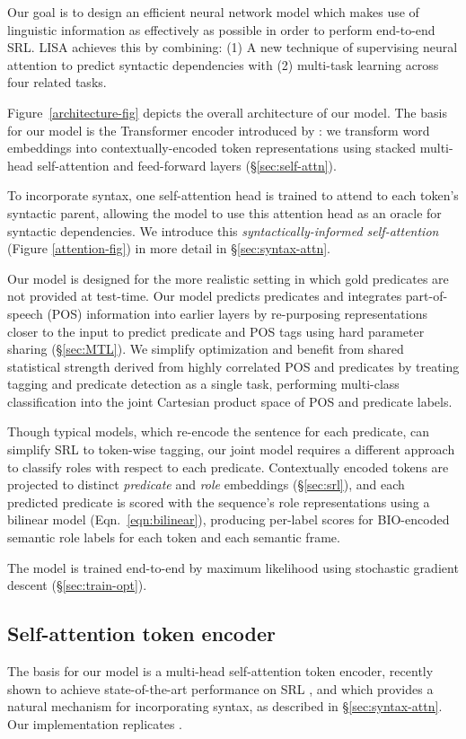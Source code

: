 \documentclass[11pt,a4paper]{article}
\begin{document}
Our goal is to design an efficient neural network model which makes use of linguistic information as effectively as possible in order to perform end-to-end SRL. LISA achieves this by combining: (1) A new technique of supervising neural attention to predict syntactic dependencies with (2) multi-task learning across four related tasks. 


Figure~\ref{architecture-fig} depicts the overall architecture of our model. The basis for our model is the Transformer encoder introduced by \citet{vaswani2017attention}: we transform word embeddings into contextually-encoded token representations using stacked multi-head self-attention and feed-forward layers (\S\ref{sec:self-attn}). 

To incorporate syntax, one self-attention head is trained to attend to each token's syntactic parent, allowing the model to use this attention head as an oracle for syntactic dependencies. We introduce this \emph{syntactically-informed self-attention} (Figure \ref{attention-fig}) in more detail in \S\ref{sec:syntax-attn}. 


Our model is designed for the more realistic setting in which gold predicates are not provided at test-time. Our model predicts predicates and integrates part-of-speech (POS) information into earlier layers by re-purposing representations closer to the input to predict predicate and POS tags using hard parameter sharing (\S\ref{sec:MTL}). We simplify optimization and benefit from shared statistical strength derived from highly correlated POS and predicates by treating tagging and predicate detection as a single task, performing multi-class classification into the joint Cartesian product space of POS and predicate labels. 

Though typical models, which re-encode the sentence for each predicate, can simplify SRL to token-wise tagging, our joint model requires a different approach to classify roles with respect to each predicate. Contextually encoded tokens are projected to distinct \emph{predicate} and \emph{role} embeddings (\S\ref{sec:srl}), and each predicted predicate is scored with the sequence's role representations using a bilinear model (Eqn.~\ref{eqn:bilinear}), producing per-label scores for BIO-encoded semantic role labels for each token and each semantic frame. 

The model is trained end-to-end by maximum likelihood using stochastic gradient descent (\S\ref{sec:train-opt}). 

\subsection{Self-attention token encoder \label{sec:self-attn}}
The basis for our model is a multi-head self-attention token encoder, recently shown to achieve state-of-the-art performance on SRL \citep{tan2018deep}, and which provides a natural mechanism for incorporating syntax, as described in \S\ref{sec:syntax-attn}. Our implementation replicates \citet{vaswani2017attention}. 
\end{document}
